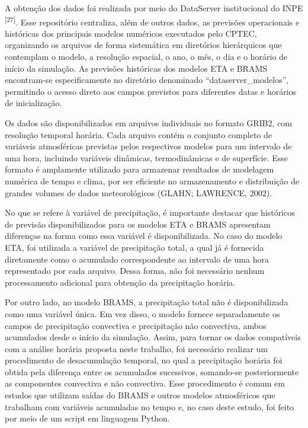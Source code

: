 \documentclass[12pt,a4paper,oneside]{book}
\begin{document}
A obtenção dos dados foi realizada por meio do DataServer institucional do INPE \textsuperscript{{[}27{]}}. Esse repositório centraliza, além de outros dados, as previsões operacionais e históricas dos principais modelos numéricos executados pelo CPTEC, organizando os arquivos de forma sistemática em diretórios hierárquicos que contemplam o modelo, a resolução espacial, o ano, o mês, o dia e o horário de início da simulação. As previsões históricas dos modelos ETA e BRAMS encontram-se especificamente no diretório denominado ``dataserver\_modelos'', permitindo o acesso direto aos campos previstos para diferentes datas e horários de inicialização.

Os dados são disponibilizados em arquivos individuais no formato GRIB2, com resolução temporal horária. Cada arquivo contém o conjunto completo de variáveis atmosféricas previstas pelos respectivos modelos para um intervalo de uma hora, incluindo variáveis dinâmicas, termodinâmicas e de superfície. Esse formato é amplamente utilizado para armazenar resultados de modelagem numérica de tempo e clima, por ser eficiente no armazenamento e distribuição de grandes volumes de dados meteorológicos (GLAHN; LAWRENCE, 2002).

No que se refere à variável de precipitação, é importante destacar que históricos de previsão disponibilizados para os modelos ETA e BRAMS apresentam diferenças na forma como essa variável é disponibilizada. No caso do modelo ETA, foi utilizada a variável de precipitação total, a qual já é fornecida diretamente como o acumulado correspondente ao intervalo de uma hora representado por cada arquivo. Dessa forma, não foi necessário nenhum processamento adicional para obtenção da precipitação horária.

Por outro lado, no modelo BRAMS, a precipitação total não é disponibilizada como uma variável única. Em vez disso, o modelo fornece separadamente os campos de precipitação convectiva e precipitação não convectiva, ambos acumulados desde o início da simulação. Assim, para tornar os dados compatíveis com a análise horária proposta neste trabalho, foi necessário realizar um procedimento de desacumulação temporal, no qual a precipitação horária foi obtida pela diferença entre os acumulados sucessivos, somando-se posteriormente as componentes convectiva e não convectiva. Esse procedimento é comum em estudos que utilizam saídas do BRAMS e outros modelos atmosféricos que trabalham com variáveis acumuladas no tempo e, no caso deste estudo, foi feito por meio de um script em linguagem Python.
\end{document}
